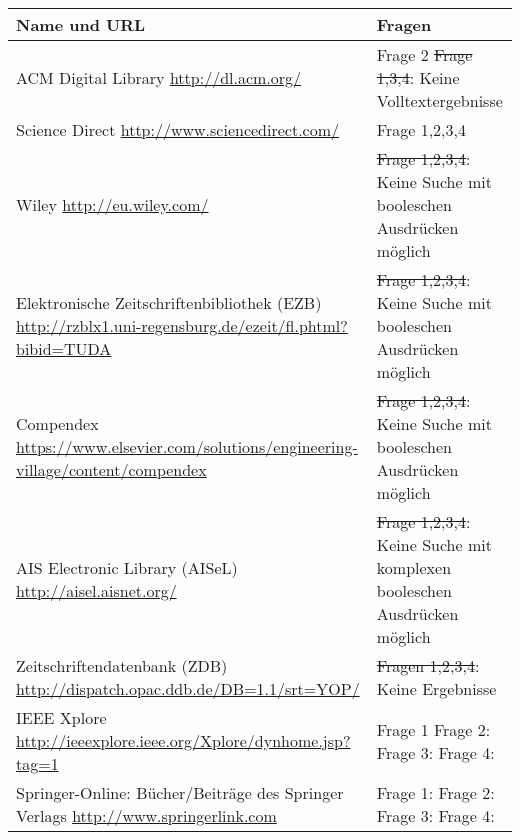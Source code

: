  \begin{table}[bh]
\centering
\begin{tabular}{|p{}|p{}|}
	\hline
	\textbf{Name und URL} & \textbf{Fragen}\\
	\hline
	ACM Digital Library \newline \url{http://dl.acm.org/} &
	Frage 2 \newline
	\st{Frage 1,3,4}: Keine Volltextergebnisse \\
	\hline
	Science Direct \newline \url{http://www.sciencedirect.com/} & 
	Frage 1,2,3,4 \\
	\hline
	Wiley \newline \url{http://eu.wiley.com/} & 
	\st{Frage 1,2,3,4}: Keine Suche mit booleschen Ausdrücken möglich \\
	\hline
	Elektronische Zeitschriftenbibliothek (EZB)\newline
\url{http://rzblx1.uni-regensburg.de/ezeit/fl.phtml?bibid=TUDA} & 
	\st{Frage 1,2,3,4}: Keine Suche mit booleschen Ausdrücken möglich \\
	\hline
	Compendex \newline
\url{https://www.elsevier.com/solutions/engineering-village/content/compendex} 
& 
	\st{Frage 1,2,3,4}: Keine Suche mit booleschen Ausdrücken möglich \\
	\hline
	AIS Electronic Library (AISeL) \newline \url{http://aisel.aisnet.org/} &
	\st{Frage 1,2,3,4}: Keine Suche mit komplexen booleschen Ausdrücken 
möglich \\
	\hline
	Zeitschriftendatenbank (ZDB) \newline 
\url{http://dispatch.opac.ddb.de/DB=1.1/srt=YOP/} & 
	\st{Fragen 1,2,3,4}: Keine Ergebnisse\\
	\hline
	IEEE Xplore \newline 
	\url{http://ieeexplore.ieee.org/Xplore/dynhome.jsp?tag=1} & 
	Frage 1 \newline
	Frage 2: \newline
	Frage 3: \newline 
	Frage 4: \\
	\hline
	Springer-Online: Bücher/Beiträge des Springer Verlags \newline
	\url{http://www.springerlink.com} & 
	Frage 1: \newline
	Frage 2: \newline
	Frage 3: \newline 
	Frage 4: \\

\end{tabular}
\end{table}

